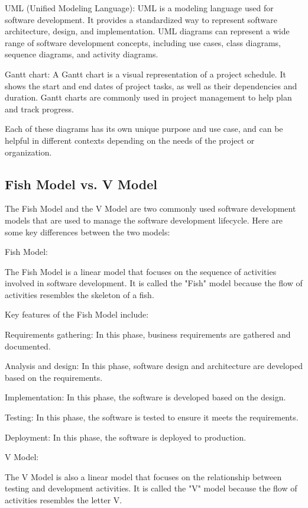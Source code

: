 \documentclass[12pt, a4paper, oneside]{article}
\begin{document}
UML (Unified Modeling Language): UML is a modeling language used for software development. It provides a standardized way to represent software architecture, design, and implementation. UML diagrams can represent a wide range of software development concepts, including use cases, class diagrams, sequence diagrams, and activity diagrams.

Gantt chart: A Gantt chart is a visual representation of a project schedule. It shows the start and end dates of project tasks, as well as their dependencies and duration. Gantt charts are commonly used in project management to help plan and track progress.

Each of these diagrams has its own unique purpose and use case, and can be helpful in different contexts depending on the needs of the project or organization.




\subsection{ Fish Model vs. V Model  }
The Fish Model and the V Model are two commonly used software development models that are used to manage the software development lifecycle. Here are some key differences between the two models:

Fish Model:

The Fish Model is a linear model that focuses on the sequence of activities involved in software development. It is called the "Fish" model because the flow of activities resembles the skeleton of a fish.

Key features of the Fish Model include:

Requirements gathering: In this phase, business requirements are gathered and documented.

Analysis and design: In this phase, software design and architecture are developed based on the requirements.

Implementation: In this phase, the software is developed based on the design.

Testing: In this phase, the software is tested to ensure it meets the requirements.

Deployment: In this phase, the software is deployed to production.

V Model:

The V Model is also a linear model that focuses on the relationship between testing and development activities. It is called the "V" model because the flow of activities resembles the letter V.
\end{document}
